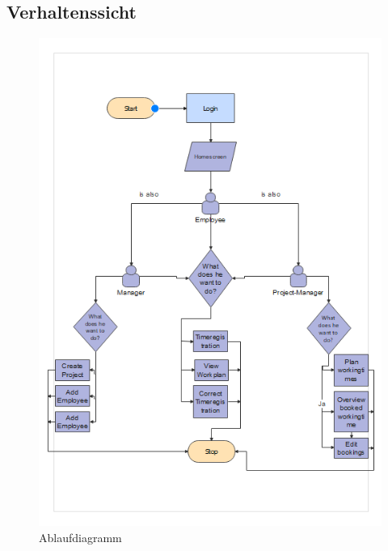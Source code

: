 \documentclass{article}
\begin{document}
\subsection{ Verhaltenssicht}
\begin{figure}[h]
    \centering
    \includegraphics[scale=0.9]{images/Verhaltenssicht.png}
    \caption{Ablaufdiagramm}
    \label{fig:beispiel}
\end{figure}
\newpage
\end{document}
